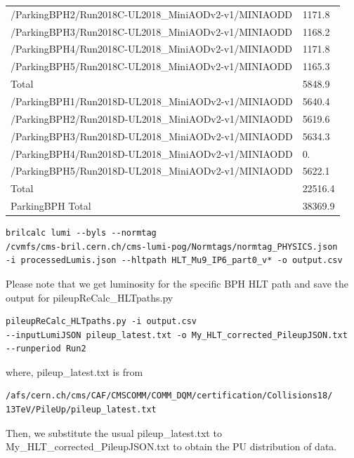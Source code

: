 \begin{table}[htb!]
\begin{center}
\begin{tabular}{l|l}
      /ParkingBPH2/Run2018C-UL2018\_MiniAODv2-v1/MINIAODD  & 1171.8 \\
      /ParkingBPH3/Run2018C-UL2018\_MiniAODv2-v1/MINIAODD  & 1168.2 \\
      /ParkingBPH4/Run2018C-UL2018\_MiniAODv2-v1/MINIAODD  & 1171.8 \\
      /ParkingBPH5/Run2018C-UL2018\_MiniAODv2-v1/MINIAODD  & 1165.3 \\
      Total & 5848.9\\
      \hline
      /ParkingBPH1/Run2018D-UL2018\_MiniAODv2-v1/MINIAODD  & 5640.4 \\
      /ParkingBPH2/Run2018D-UL2018\_MiniAODv2-v1/MINIAODD  & 5619.6 \\
      /ParkingBPH3/Run2018D-UL2018\_MiniAODv2-v1/MINIAODD  & 5634.3 \\
      /ParkingBPH4/Run2018D-UL2018\_MiniAODv2-v1/MINIAODD  & 0. \\
      /ParkingBPH5/Run2018D-UL2018\_MiniAODv2-v1/MINIAODD  & 5622.1 \\
      Total & 22516.4\\
      \hline
      ParkingBPH Total & 38369.9 \\
      \hline
    \end{tabular}
    \label{tab:datasample2018BPH}
  \end{center}
\end{table}


\begin{verbatim}
brilcalc lumi --byls --normtag 
/cvmfs/cms-bril.cern.ch/cms-lumi-pog/Normtags/normtag_PHYSICS.json 
-i processedLumis.json --hltpath HLT_Mu9_IP6_part0_v* -o output.csv
\end{verbatim}
Please note that we get luminosity for the specific BPH HLT path and save the output for pileupReCalc\_HLTpaths.py

\begin{verbatim}
pileupReCalc_HLTpaths.py -i output.csv 
--inputLumiJSON pileup_latest.txt -o My_HLT_corrected_PileupJSON.txt 
--runperiod Run2
\end{verbatim}

where, pileup\_latest.txt is from

\begin{verbatim}
/afs/cern.ch/cms/CAF/CMSCOMM/COMM_DQM/certification/Collisions18/
13TeV/PileUp/pileup_latest.txt
\end{verbatim}


Then, we substitute the usual pileup\_latest.txt to My\_HLT\_corrected\_PileupJSON.txt to obtain the PU distribution of data. 

